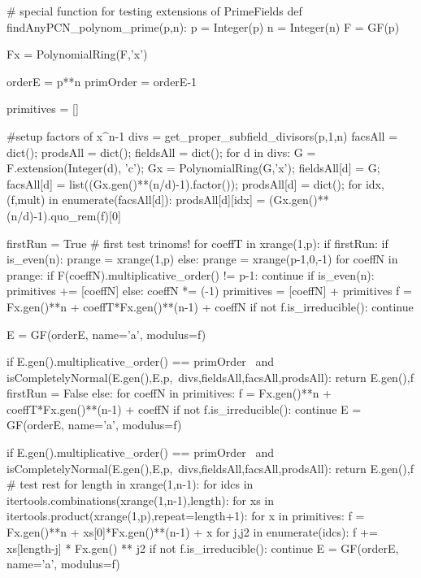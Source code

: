 \begin{sagecode}[caption={Aus \url{../Sage/findAnyPCN_trinom.spyx}},
  label=lst:findAnyPCN_polynom_prime]
# special function for testing extensions of PrimeFields
def findAnyPCN_polynom_prime(p,n):
    p = Integer(p)
    n = Integer(n)
    F = GF(p)
    
    Fx = PolynomialRing(F,'x')
    
    orderE = p**n
    primOrder = orderE-1
    
    primitives = []

    #setup factors of x^n-1
    divs = get_proper_subfield_divisors(p,1,n)
    facsAll = dict();
    prodsAll = dict();
    fieldsAll = dict();
    for d in divs:
        G = F.extension(Integer(d), 'c');
        Gx = PolynomialRing(G,'x');
        fieldsAll[d] = G;
        facsAll[d] = list((Gx.gen()**(n/d)-1).factor());
        prodsAll[d] = dict();
        for idx,(f,mult) in enumerate(facsAll[d]):
            prodsAll[d][idx] = (Gx.gen()**(n/d)-1).quo_rem(f)[0]

    firstRun = True
    # first test trinoms!
    for coeffT in xrange(1,p):
        if firstRun:
            if is_even(n):
                prange = xrange(1,p)
            else:
                prange = xrange(p-1,0,-1)
            for coeffN in prange:
                if F(coeffN).multiplicative_order() != p-1: continue
                if is_even(n):
                    primitives += [coeffN]
                else:
                    coeffN *= (-1)
                    primitives = [coeffN] + primitives
                f = Fx.gen()**n + coeffT*Fx.gen()**(n-1) + coeffN
                if not f.is_irreducible(): continue
                
                E = GF(orderE, name='a', modulus=f)

                if E.gen().multiplicative_order() == primOrder \
                        and isCompletelyNormal(E.gen(),E,p,\
                            divs,fieldsAll,facsAll,prodsAll):
                    return E.gen(),f
            firstRun = False
        else:
            for coeffN in primitives:
                f = Fx.gen()**n + coeffT*Fx.gen()**(n-1) + coeffN
                if not f.is_irreducible(): continue
                E = GF(orderE, name='a', modulus=f)

                if E.gen().multiplicative_order() == primOrder \
                        and isCompletelyNormal(E.gen(),E,p,\
                            divs,fieldsAll,facsAll,prodsAll):
                    return E.gen(),f
    # test rest
    for length in xrange(1,n-1):
        for idcs in itertools.combinations(xrange(1,n-1),length):
            for xs in itertools.product(xrange(1,p),repeat=length+1):
                for x in primitives:
                    f = Fx.gen()**n + xs[0]*Fx.gen()**(n-1) + x
                    for j,j2 in enumerate(idcs):
                        f += xs[length-j] * Fx.gen() ** j2
                    if not f.is_irreducible(): continue
                    E = GF(orderE, name='a', modulus=f)


\end{sagecode}

